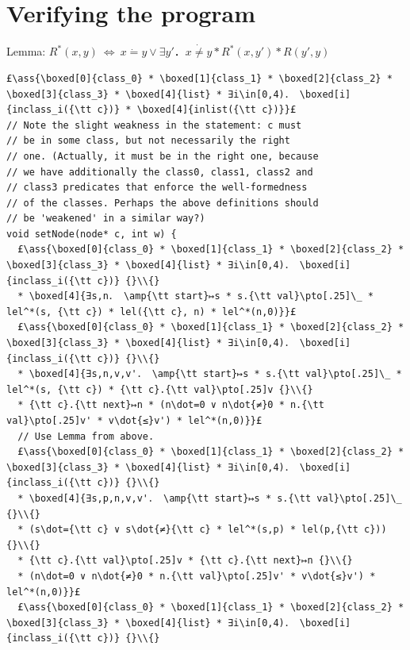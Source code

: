 \documentclass[12pt,a4paper]{article}
\makeatletter
\newcommand{\ml}[2][t]{\mbox{\mdseries\begin{tabular}[#1]{@{}L@{}}#2\end{tabular}}}
\newcommand{\ass}[1]{\ensuremath{{\color{blue}\left\{\ml[c]{#1}\right\}}}}
\makeatother
\begin{document}
\section{Verifying the program}

Lemma: $R^*(x,y) \ ⇔\ x\dot=y ∨ ∃y'． x\dot{≠}y * R^*(x,y') * R(y',y)$

\begin{lstlisting}
£\ass{\boxed[0]{class_0} * \boxed[1]{class_1} * \boxed[2]{class_2} * \boxed[3]{class_3} * \boxed[4]{list} * ∃i\in[0,4)． \boxed[i]{inclass_i({\tt c})} * \boxed[4]{inlist({\tt c})}}£
// Note the slight weakness in the statement: c must
// be in some class, but not necessarily the right
// one. (Actually, it must be in the right one, because
// we have additionally the class0, class1, class2 and
// class3 predicates that enforce the well-formedness
// of the classes. Perhaps the above definitions should
// be 'weakened' in a similar way?)
void setNode(node* c, int w) {
  £\ass{\boxed[0]{class_0} * \boxed[1]{class_1} * \boxed[2]{class_2} * \boxed[3]{class_3} * \boxed[4]{list} * ∃i\in[0,4)． \boxed[i]{inclass_i({\tt c})} {}\\{}
  * \boxed[4]{∃s,n． \amp{\tt start}↦s * s.{\tt val}\pto[.25]\_ * lel^*(s, {\tt c}) * lel({\tt c}, n) * lel^*(n,0)}}£
  £\ass{\boxed[0]{class_0} * \boxed[1]{class_1} * \boxed[2]{class_2} * \boxed[3]{class_3} * \boxed[4]{list} * ∃i\in[0,4)． \boxed[i]{inclass_i({\tt c})} {}\\{}
  * \boxed[4]{∃s,n,v,v'． \amp{\tt start}↦s * s.{\tt val}\pto[.25]\_ * lel^*(s, {\tt c}) * {\tt c}.{\tt val}\pto[.25]v {}\\{}
  * {\tt c}.{\tt next}↦n * (n\dot=0 ∨ n\dot{≠}0 * n.{\tt val}\pto[.25]v' * v\dot{≤}v') * lel^*(n,0)}}£
  // Use Lemma from above. 
  £\ass{\boxed[0]{class_0} * \boxed[1]{class_1} * \boxed[2]{class_2} * \boxed[3]{class_3} * \boxed[4]{list} * ∃i\in[0,4)． \boxed[i]{inclass_i({\tt c})} {}\\{}
  * \boxed[4]{∃s,p,n,v,v'． \amp{\tt start}↦s * s.{\tt val}\pto[.25]\_ {}\\{}
  * (s\dot={\tt c} ∨ s\dot{≠}{\tt c} * lel^*(s,p) * lel(p,{\tt c})) {}\\{}
  * {\tt c}.{\tt val}\pto[.25]v * {\tt c}.{\tt next}↦n {}\\{}
  * (n\dot=0 ∨ n\dot{≠}0 * n.{\tt val}\pto[.25]v' * v\dot{≤}v') * lel^*(n,0)}}£
  £\ass{\boxed[0]{class_0} * \boxed[1]{class_1} * \boxed[2]{class_2} * \boxed[3]{class_3} * \boxed[4]{list} * ∃i\in[0,4)． \boxed[i]{inclass_i({\tt c})} {}\\{}

\end{lstlisting}
\end{document}
